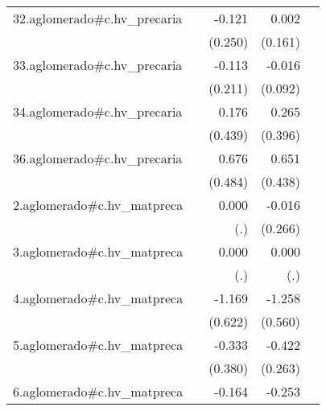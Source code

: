 {\begin{longtable}{l*{4}{D{.}{.}{-1}}}
\addlinespace
32.aglomerado#c.hv\_precaria&                     &      -0.121         &       0.002         &                     \\
            &                     &     (0.250)         &     (0.161)         &                     \\
\addlinespace
33.aglomerado#c.hv\_precaria&                     &      -0.113         &      -0.016         &                     \\
            &                     &     (0.211)         &     (0.092)         &                     \\
\addlinespace
34.aglomerado#c.hv\_precaria&                     &       0.176         &       0.265         &                     \\
            &                     &     (0.439)         &     (0.396)         &                     \\
\addlinespace
36.aglomerado#c.hv\_precaria&                     &       0.676         &       0.651         &                     \\
            &                     &     (0.484)         &     (0.438)         &                     \\
\addlinespace
2.aglomerado#c.hv\_matpreca&                     &       0.000         &      -0.016         &                     \\
            &                     &         (.)         &     (0.266)         &                     \\
\addlinespace
3.aglomerado#c.hv\_matpreca&                     &       0.000         &       0.000         &                     \\
            &                     &         (.)         &         (.)         &                     \\
\addlinespace
4.aglomerado#c.hv\_matpreca&                     &      -1.169         &      -1.258\sym{*}  &                     \\
            &                     &     (0.622)         &     (0.560)         &                     \\
\addlinespace
5.aglomerado#c.hv\_matpreca&                     &      -0.333         &      -0.422         &                     \\
            &                     &     (0.380)         &     (0.263)         &                     \\
\addlinespace
6.aglomerado#c.hv\_matpreca&                     &      -0.164         &      -0.253         &                     \\

\end{longtable}}
